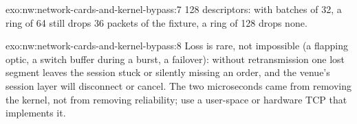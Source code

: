\begin{solution}{exo:nw:network-cards-and-kernel-bypass:7}
128 descriptors: with batches of 32, a ring of 64 still drops 36 packets of the fixture, a ring of 128 drops none.
\end{solution}

\begin{solution}{exo:nw:network-cards-and-kernel-bypass:8}
Loss is rare, not impossible (a flapping optic, a switch buffer during a burst, a failover): without retransmission one lost segment
leaves the session stuck or silently missing an order, and the venue's session layer will disconnect or cancel. The two microseconds
came from removing the kernel, not from removing reliability; use a user-space or hardware TCP that implements it.
\end{solution}

